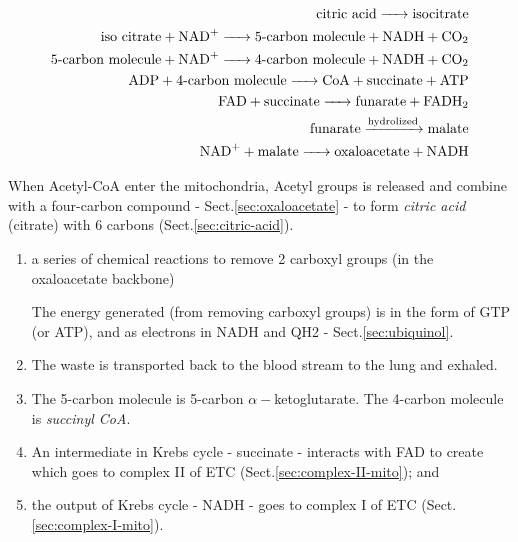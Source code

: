 
\begin{equation}
  \label{eq:10}
  \begin{split}
    \ce{\text{citric acid} -> \text{isocitrate}} \\
    \ce{\text{iso citrate} + NAD+ -> \text{5-carbon molecule} + NADH
      + CO2} \\
    \ce{\text{5-carbon molecule} + NAD+ -> \text{4-carbon molecule} +
      NADH + CO2} \\
    \ce{ADP + \text{4-carbon molecule} -> \text{CoA} +
      \text{succinate} + ATP} \\
    \ce{FAD + \text{succinate} -> \text{funarate} +  FADH2 } \\
    \ce{\text{funarate} ->[hydrolized] \text{malate}} \\
    \ce{NAD+ + \text{malate} -> \text{oxaloacetate} +  NADH } 
  \end{split}
\end{equation}

When Acetyl-CoA enter the mitochondria, Acetyl groups is released and
combine with a four-carbon compound - Sect.\ref{sec:oxaloacetate} - to form
{\it citric acid} (citrate) with 6 carbons (Sect.\ref{sec:citric-acid}).
\begin{enumerate}
  \item a series of chemical reactions to remove 2 carboxyl groups (in the
  oxaloacetate backbone)

The energy generated (from removing carboxyl groups) is in the form of
GTP (or ATP), and as electrons in NADH and QH2 - Sect.\ref{sec:ubiquinol}.

  \item The waste  is transported back to the blood stream to the lung
  and exhaled.

  \item The 5-carbon molecule is 5-carbon $\alpha-$ketoglutarate.  The 4-carbon
  molecule is {\it succinyl CoA}.

  \item An intermediate in Krebs cycle - succinate - interacts with FAD to
  create  which goes to complex II of ETC
  (Sect.\ref{sec:complex-II-mito}); and

  \item the output of Krebs cycle - NADH - goes to complex I of ETC
  (Sect.\ref{sec:complex-I-mito}).

\end{enumerate}


